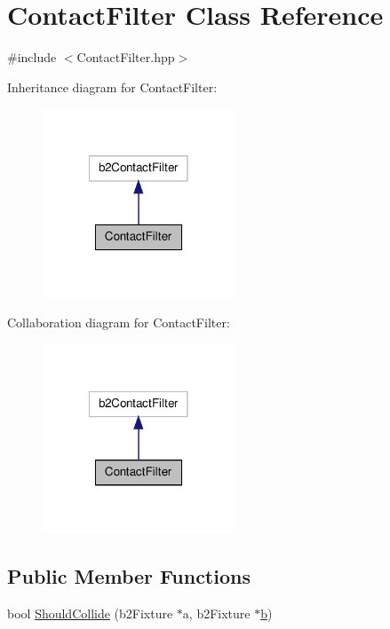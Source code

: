 \hypertarget{class_contact_filter}{\section{Contact\-Filter Class Reference}
\label{class_contact_filter}
}


{\ttfamily \#include $<$Contact\-Filter.\-hpp$>$}



Inheritance diagram for Contact\-Filter\-:
\nopagebreak
\begin{figure}[H]
\begin{center}
\leavevmode
\includegraphics[width=162pt]{class_contact_filter__inherit__graph}
\end{center}
\end{figure}


Collaboration diagram for Contact\-Filter\-:
\nopagebreak
\begin{figure}[H]
\begin{center}
\leavevmode
\includegraphics[width=162pt]{class_contact_filter__coll__graph}
\end{center}
\end{figure}
\subsection*{Public Member Functions}
\begin{DoxyCompactItemize}
\item 
bool \hyperlink{class_contact_filter_aa1f43a83fda36c0d4e0479e370350585}{Should\-Collide} (b2\-Fixture $\ast$a, b2\-Fixture $\ast$\hyperlink{jquery_8js_a2fa551895933fae935a0a6b87282241d}{b})
\end{DoxyCompactItemize}


